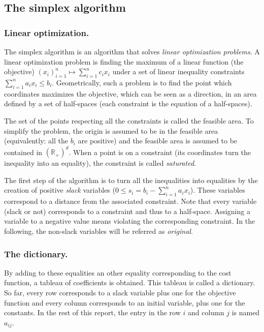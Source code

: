 \subsection{The simplex algorithm}

\subsubsection{Linear optimization.}
The simplex algorithm is an algorithm that solves \emph{linear optimization problems}. A linear optimization problem is finding the maximum of a linear function (the objective) $(x_i)_{i=1}^n \mapsto \sum_{i=1}^n c_i x_i$  under a set of linear inequality constraints $\sum_{i=1}^n a_i x_i \leq b_i$. Geometrically, such a problem is to find the point which coordinates maximizes the objective, which can be seen as a direction, in an area defined by a set of half-spaces (each constraint is the equation of a half-spaces).

The set of the points respecting all the constraints is called the feasible area. To simplify the problem, the origin is assumed to be in the feasible area (equivalently: all the $b_i$ are positive) and the feasible area is assumed to be contained in $(\mathbb{R}_+)^d$. When a point is on a constraint (its coordinates turn the inequality into an equality), the constraint is called \emph{saturated}. 

The first step of the algorithm is to turn all the inequalities into equalities by the creation of positive \emph{slack} variables ($ 0 \leq s_i = b_i - \sum_{i=1}^n a_i x_i$). These variables correspond to a distance from the associated constraint. Note that every variable (slack or not) corresponds to a constraint and thus to a half-space. Assigning a variable to a negative value means violating the corresponding constraint. In the following, the non-slack variables will be referred as \emph{original}.

\subsubsection{The dictionary.}
By adding to these equalities an other equality corresponding to the cost function, a tableau of coefficients is obtained. This tableau is called a dictionary. So far, every row corresponds to a slack variable plus one for the objective function and every column corresponds to an initial variable, plus one for the constants. In the rest of this report, the entry in the row $i$ and column $j$ is named $a_{ij}$.


